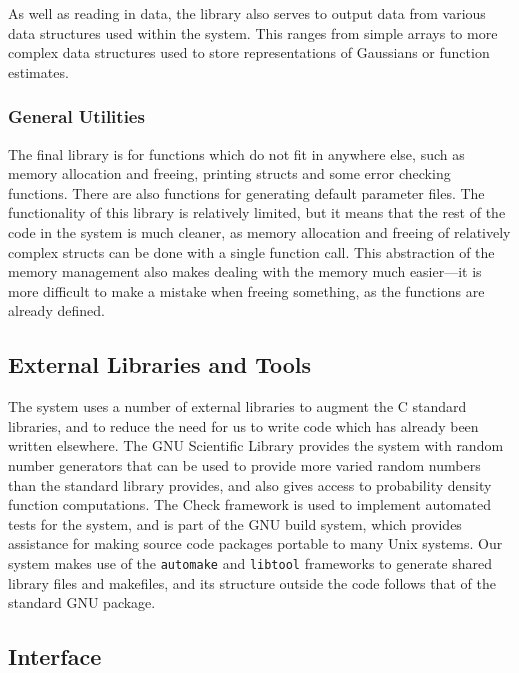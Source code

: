 \documentclass[a4paper,11pt]{article}
\begin{document}
    As well as reading in data, the library also serves to output data from
    various data structures used within the system. This ranges from simple
    arrays to more complex data structures used to store representations of
    Gaussians or function estimates.
\subsubsection{General Utilities}
\label{sec-3-3-4}

    The final library is for functions which do not fit in anywhere else, such
    as memory allocation and freeing, printing structs and some error checking
    functions. There are also functions for generating default parameter
    files. The functionality of this library is relatively limited, but it means
    that the rest of the code in the system is much cleaner, as memory
    allocation and freeing of relatively complex structs can be done with a
    single function call. This abstraction of the memory management also makes
    dealing with the memory much easier---it is more difficult to make a mistake
    when freeing something, as the functions are already defined.
\subsection{External Libraries and Tools}
\label{sec-3-4}

   The system uses a number of external libraries to augment the C standard
   libraries, and to reduce the need for us to write code which has already been
   written elsewhere. The GNU Scientific Library \cite{gsl} provides the system
   with random number generators that can be used to provide more varied random
   numbers than the standard library provides, and also gives access to
   probability density function computations. The Check framework \cite{check}
   is used to implement automated tests for the system, and is part of the GNU
   build system, which provides assistance for making source code packages
   portable to many Unix systems. Our system makes use of the \texttt{automake}
   and \texttt{libtool} frameworks to generate shared library files and
   makefiles, and its structure outside the code follows that of the standard
   GNU package.
\subsection{Interface}
\label{sec-3-5}
\end{document}
